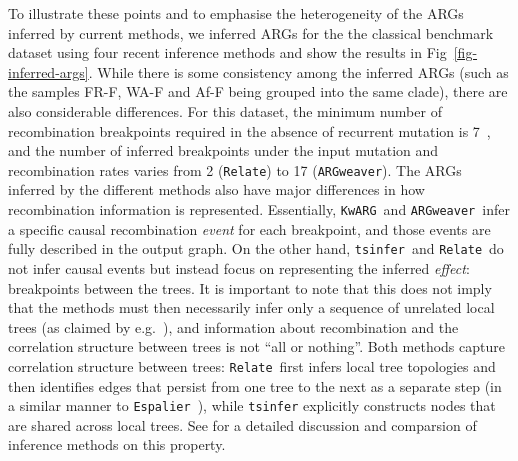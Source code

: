 \documentclass{article}
\newcommand{\tsinfer}[0]{\texttt{tsinfer}}
\newcommand{\kwarg}[0]{\texttt{KwARG}}
\newcommand{\argweaver}[0]{\texttt{ARGweaver}}
\newcommand{\relate}[0]{\texttt{Relate}}
\newcommand{\espalier}[0]{\texttt{Espalier}}
\begin{document}
To illustrate these points and to emphasise the heterogeneity
of the ARGs inferred by current methods, we inferred ARGs for the
the classical \citet{kreitman1983nucleotide} benchmark dataset
using four recent inference methods and show the results in
Fig~\ref{fig-inferred-args}.
While there is some consistency among the inferred ARGs (such as the samples
FR-F, WA-F and Af-F being grouped into the same clade), there
are also considerable differences. For this dataset, the minimum number
of recombination breakpoints required in the absence of recurrent mutation
is 7~\citep{song2003parsimonious}, and the number of inferred breakpoints
under the input mutation and recombination rates
varies from 2 (\relate) to 17 (\argweaver).
The ARGs inferred by the different methods also have major differences
in how recombination information is represented. Essentially,
\kwarg\ and \argweaver\ infer a specific causal recombination \emph{event}
for each breakpoint, and those events are fully
described in the output graph. On the other hand, \tsinfer\ and
\relate\ do not infer causal events but instead focus on
representing the inferred \emph{effect}: breakpoints between the
trees. It is important to note that this does not imply that
the methods must then necessarily infer only a sequence of
unrelated local trees
(as claimed by e.g.~\citet{hejase2020summary}),
and information about recombination and the correlation structure
between trees is not ``all or nothing''.
Both methods capture correlation structure between trees:
\relate\ first infers local tree topologies and then identifies edges
that persist from one tree to the next as a separate step
(in a similar manner to \espalier~\citep{rasmussen2022espalier}), while
\texttt{tsinfer} explicitly constructs nodes that are shared across local
trees. See \cite{ignatieva2023distribution} for a detailed discussion
and comparsion of inference methods on this property.

\end{document}
